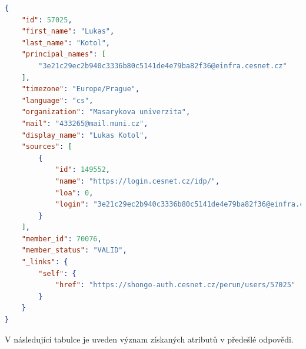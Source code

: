 \documentclass[
  printed, %
  twoside, %
  table,   %
  nolof,     %
  nolot,     %
]{fithesis3}
\begin{document}
\begin{lstlisting}[language=json,firstnumber=1]
{
    "id": 57025,
    "first_name": "Lukas",
    "last_name": "Kotol",
    "principal_names": [
        "3e21c29ec2b940c3336b80c5141de4e79ba82f36@einfra.cesnet.cz"
    ],
    "timezone": "Europe/Prague",
    "language": "cs",
    "organization": "Masarykova univerzita",
    "mail": "433265@mail.muni.cz",
    "display_name": "Lukas Kotol",
    "sources": [
        {
            "id": 149552,
            "name": "https://login.cesnet.cz/idp/",
            "loa": 0,
            "login": "3e21c29ec2b940c3336b80c5141de4e79ba82f36@einfra.cesnet.cz"
        }
    ],
    "member_id": 70076,
    "member_status": "VALID",
    "_links": {
        "self": {
            "href": "https://shongo-auth.cesnet.cz/perun/users/57025"
        }
    }
}
\end{lstlisting}
V následující tabulce je uveden význam získaných atributů v předešlé odpovědi.
\end{document}
